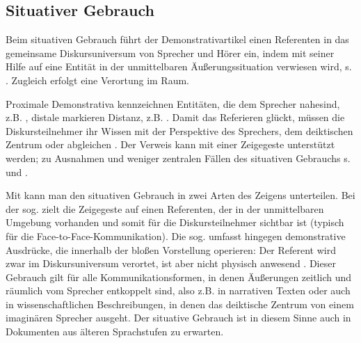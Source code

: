 \subsection{Situativer Gebrauch}\label{sec:situativ}

Beim situativen Gebrauch \parencite[auch deiktischer Gebrauch, z.B. bei][]{Bisle-Muller1991,Consten2004,Studler2011} führt der Demonstrativartikel einen Referenten in das gemeinsame Diskursuniversum von Sprecher und Hörer ein, indem mit seiner Hilfe auf eine Entität in der unmittelbaren Äußerungssituation verwiesen wird, s. . Zugleich erfolgt eine Verortung im Raum.

\begin{exe}
	\ex \label{ex:deikt} 
\end{exe}

Proximale Demonstrativa kennzeichnen Entitäten, die dem Sprecher nahe\linebreak sind, z.B. , distale markieren Distanz, z.B. .
Damit das Referieren glückt, müssen die Diskursteilnehmer ihr Wissen mit der Perspektive des Sprechers, dem deiktischen Zentrum oder   \parencite{Buhler1934} abgleichen  \parencite[s. auch][327ff.]{Hoffmann2009}. Der Verweis kann mit einer Zeigegeste unterstützt werden; zu Ausnahmen und weniger zentralen Fällen des situativen Gebrauchs s. \textcite[S. 94-95]{Diessel1999} und \textcite[219--224]{Himmelmann1996}. 

Mit \textcite[]{Buhler1934} kann man den situativen Gebrauch in zwei Arten des Zeigens unterteilen. Bei der sog.  zielt die Zeigegeste auf einen Referenten, der in der unmittelbaren Umgebung vorhanden und somit für die Diskursteilnehmer sichtbar ist (typisch für die Face-to-Face-Kommunikation). Die sog.  umfasst hingegen demonstrative Ausdrücke, die innerhalb der bloßen Vorstellung operieren: Der Referent wird zwar im Diskursuniversum verortet, ist aber nicht physisch anwesend \parencite[s. auch][222]{Himmelmann1996}. Dieser Gebrauch gilt für alle Kommunikationsformen, in denen Äußerungen zeitlich und räumlich vom Sprecher entkoppelt sind, also z.B. in narrativen Texten \parencite[95]{Diessel1999} oder auch in wissenschaftlichen Beschreibungen, in denen das deiktische Zentrum von einem imaginären Sprecher ausgeht. Der situative Gebrauch ist in diesem Sinne auch in Dokumenten aus älteren Sprachstufen zu erwarten. 

